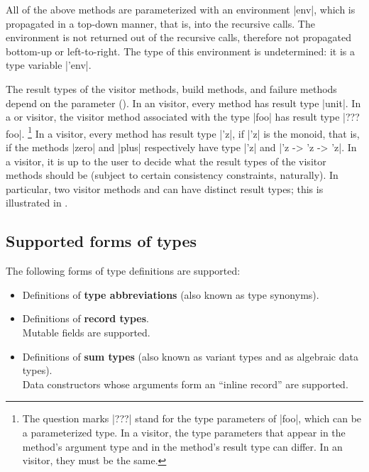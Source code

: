 \documentclass[11pt,a4paper,twoside]{article}
\renewcommand{\emph}[1]{\textbf{#1}}
\begin{document}
All of the above methods are parameterized with an environment \oc|env|, which
is propagated in a top-down manner, that is, into the recursive calls. The
environment is not returned out of the recursive calls, therefore not
propagated bottom-up or left-to-right. The type of this environment is
undetermined: it is a type variable \oc|'env|.

The result types of the visitor methods, build methods, and failure methods
depend on the parameter \variety (). In an \iter visitor,
every method has result type \oc|unit|. In a \map or \mapendo visitor, the
visitor method associated with the type \oc|foo| has result type \oc|??? foo|.%
%
\footnote{The question marks \oc|???| stand for the type parameters of \oc|foo|,
which can be a parameterized type. In a \map visitor, the type parameters that
appear in the method's argument type and in the method's result type can differ.
In an \mapendo visitor, they must be the same.}
%
In a \reduce visitor, every method has result type \oc|'z|, if \oc|'z| is the
monoid, that is, if the methods \oc|zero| and \oc|plus| respectively have type \oc|'z|
and \oc|'z -> 'z -> 'z|.
%
In a \fold visitor, it is up to the user to decide what the result types of
the visitor methods should be (subject to certain consistency constraints,
naturally). In particular, two visitor methods  and
 can have distinct result types; this is illustrated
in .


\subsection{Supported forms of types}

The following forms of type definitions are supported:
\begin{itemize}
\item Definitions of \emph{type abbreviations} (also known as type synonyms).
\item Definitions of \emph{record types}. \\ Mutable fields are supported.
\item Definitions of \emph{sum types} (also known as variant types and as algebraic
  data types). \\ Data constructors whose arguments form an ``inline record'' are
  supported.
\end{itemize}
\end{document}
